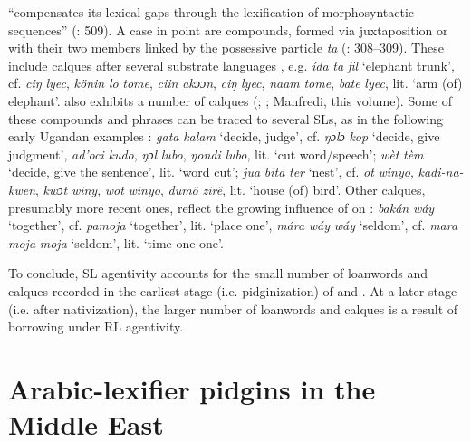 \documentclass[output=paper]{langsci/langscibook}
\begin{document}
  “compensates its lexical gaps through the lexification of  morphosyntactic sequences”  (\citealt{ToscoManfredi2013}: 509). A case in point are   {compounds}, formed via juxtaposition or with their two members linked by the possessive particle \textit{ta} (\citealt{Manfredi2014relex}: 308–309). These include calques after several {substrate} languages \citep[136]{Nakao2012}, e.g. \textit{ída} \textit{ta} \textit{fil} ‘elephant trunk’, cf.  \textit{ciŋ} \textit{lyec},  \textit{könin} \textit{lo} \textit{tome},  \textit{ciin} \textit{akɔɔn},  \textit{ciŋ} \textit{lyec},  \textit{naam} \textit{tome},  \textit{bate} \textit{lyec}, lit. ‘arm (of) elephant’.  also exhibits a number of calques (\citealt{Nakao2012}; \citealt{Avram2017talk}; Manfredi, this volume). Some of these {compounds} and phrases can be traced to several SLs, as in the following early Ugandan  examples \citep{Avram2017talk}: \textit{gata} \textit{kalam} ‘decide, judge’, cf.  \textit{ŋɔlɔ} \textit{kop} ‘decide, give judgment’,  \textit{ad'oci} \textit{kudo},  \textit{ŋɔl} \textit{lubo},  \textit{ŋondi} \textit{lubo}, lit. ‘cut word/speech’;  \textit{wèt} \textit{tèm} ‘decide, give the sentence’, lit. ‘word cut’; \textit{jua} \textit{bita} \textit{ter} ‘nest’, cf.  \textit{ot} \textit{winyo},  \textit{kadi-na-kwen},  \textit{kwɔt} \textit{winy},  \textit{wot} \textit{winyo},  \textit{dumô} \textit{zirê}, lit. ‘house (of) bird’. Other calques, presumably more recent ones, reflect the growing influence of  on  \citep[315]{Luffin2014}: \textit{bakán} \textit{wá}\textit{y} ‘together’, cf.  \textit{pamoja} ‘together’, lit. ‘place one’, \textit{mára} \textit{wá}\textit{y} \textit{wáy} ‘seldom’, cf.  \textit{mara} \textit{moja} \textit{moja} ‘seldom’, lit. ‘time one one’.

To conclude, {SL} agentivity accounts for the small number of {loanwords} and calques recorded in the earliest stage (i.e. pidginization) of   and . At a later stage (i.e. after nativization), the larger number of {loanwords} and calques is a result of borrowing under {RL} agentivity.


 \section{Arabic-lexifier pidgins in the Middle East}\label{sec:pid}
\end{document}
